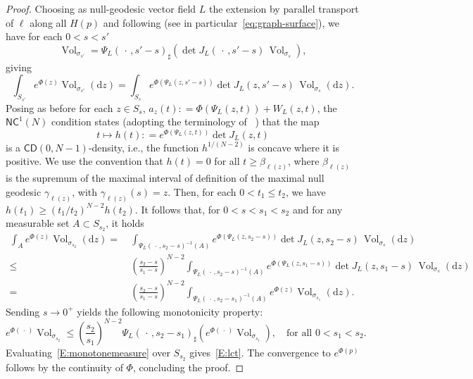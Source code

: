 \documentclass[12pt,a4paper]{amsart}
\theoremstyle{plain}
\theoremstyle{definition}
\numberwithin{equation}{section}
\DeclareMathOperator{\vol}{Vol}
\newcommand{\de}{{\mathrm{d}}}
\newcommand{\CD}{\mathsf{CD}}
\newcommand{\NC}{\mathsf{NC}}
\newcommand{\dotargument}{\,\cdot\,}
\newcommand{\gflow}{\Psi}
\begin{document}
\begin{proof}

Choosing as null-geodesic vector field $L$ 
the extension by parallel transport of $\ell$ along all $H(p)$ 
and following  (see in particular~\eqref{eq:graph-surface}), we have 
for each $0< s < s'$
%
$$
\vol_{\sigma_{s'}}
    =
\gflow_L(\dotargument, s' - s  )_\sharp 
(\det J_L (\dotargument, s' - s)
    \,
\vol_{\sigma_s}),
$$
%
giving
%
$$
\int_{S_{s'}}e^{\Phi(z)}
\vol_{\sigma_{s'}}(\de z)
=
\int_{S_{s}}e^{\Phi(\Psi_L(z, s' - s))}
\det J_L (z, s' - s)
    \,
\vol_{\sigma_s}(\de z).
$$
%
Posing as before for each $z \in S_s$, 
$a_z(t) : = \Phi(\Psi_L(z,t)) + W_L(z,t)$, 
the $\NC^1(N)$ condition states 
(adopting the terminology of ~\cite[Lemma~A.9]{CaMi:21})
that the map 
%
$$
t \mapsto 
h(t) : = e^{\Phi(\Psi_L(z, t))}
\det J_L (z, t)
$$
%
is a $\CD(0,N-1)$-density, i.e., the function
  $h^{1/(N-2)}$ is concave where it is positive.
We use the convention that $h(t)=0$ for all $t\geq \beta_{\ell(z)}$, where $\beta_{\ell(z)}$ is the supremum of the maximal interval of definition of the maximal null geodesic $\gamma_{\ell(z)}$, with $\gamma_{\ell(z)}(s)=z$.
Then, for each $0< t_1 \leq t_2$, 
we have $h(t_1) \geq (t_1/ t_2)^{N-2}h(t_2)$. It follows  that, for $0 < s < s_1 < s_2$ and for any measurable set $A \subset S_{s_2}$, it holds
%
\begin{align*}
\int_{A}e^{\Phi(z)}
\vol_{\sigma_{s_2}}(\de z)
= &~
\int_{\Psi_L(\dotargument,s_2 -s)^{-1}(A)}e^{\Phi(\Psi_L(z, s_2 - s))}
\det J_L (z, s_2 - s)
    \,
\vol_{\sigma_s}(\de z) \\
\leq &~
\left( \frac{s_2 - s}{s_1 - s} 
\right)^{N-2}
\int_{\Psi_L(\dotargument,s_2 -s)^{-1}(A)}e^{\Phi(\Psi_L(z, s_1 - s))}
\det J_L (z, s_1 - s) \,
\vol_{\sigma_s}(\de z) 
\\
= &~
\left( \frac{s_2 - s}{s_1 - s} 
\right)^{N-2}
\int_{\Psi_L(\dotargument,s_2 -s_1)^{-1}(A)}e^{\Phi(z)}
\vol_{\sigma_{s_1}}(\de z). 
\end{align*}
Sending $s \to 0^+$ yields 
the following monotonicity property: 
%
\begin{equation}\label{E:monotonemeasure}
e^{\Phi(\dotargument)}
\vol_{\sigma_{s_2}} 
\leq 
\left( \frac{s_2 }{s_1 }\right)^{N-2} \Psi_L(\dotargument, s_2-s_1)_\sharp \left( e^{\Phi(\dotargument)}
\vol_{\sigma_{s_1}} \right), \quad \text{for all } 0<s_1<s_2.
\end{equation}
%
Evaluating~\eqref{E:monotonemeasure} over $S_{s_2}$ gives~\eqref{E:lct}.  
The convergence to $e^{\Phi(p)}$ follows by the continuity of $\Phi$, 
concluding the proof.
\end{proof}
\end{document}
